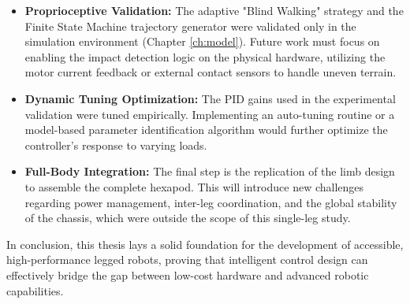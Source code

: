 \begin{itemize}
    \item \textbf{Proprioceptive Validation:} The adaptive "Blind Walking" strategy and the Finite State Machine
        trajectory generator were validated only in the simulation environment (Chapter \ref{ch:model}). Future work
        must focus on enabling the impact detection logic on the physical hardware, utilizing the motor current feedback
        or external contact sensors to handle uneven terrain.
    \item \textbf{Dynamic Tuning Optimization:} The PID gains used in the experimental validation were tuned empirically.
        Implementing an auto-tuning routine or a model-based parameter identification algorithm would further optimize
        the controller's response to varying loads.
    \item \textbf{Full-Body Integration:} The final step is the replication of the limb design to assemble the complete
        hexapod. This will introduce new challenges regarding power management, inter-leg coordination, and the global
        stability of the chassis, which were outside the scope of this single-leg study.
\end{itemize}

In conclusion, this thesis lays a solid foundation for the development of accessible, high-performance legged robots,
proving that intelligent control design can effectively bridge the gap between low-cost hardware and advanced robotic
capabilities.